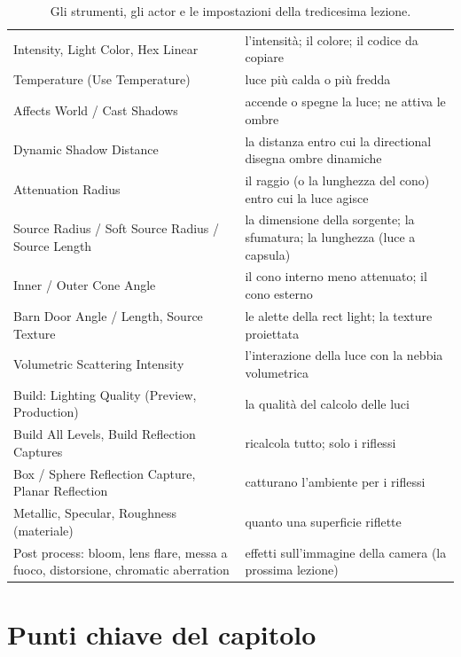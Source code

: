 \begin{table}[htbp]
\begin{tabular}{@{}p{5.8cm}p{8.2cm}@{}}
Intensity, Light Color, Hex Linear & l'intensità; il colore; il codice da copiare \\
Temperature (Use Temperature) & luce più calda o più fredda \\
Affects World / Cast Shadows & accende o spegne la luce; ne attiva le ombre \\
Dynamic Shadow Distance & la distanza entro cui la directional disegna ombre dinamiche \\
Attenuation Radius & il raggio (o la lunghezza del cono) entro cui la luce agisce \\
Source Radius / Soft Source Radius / Source Length & la dimensione della sorgente; la
sfumatura; la lunghezza (luce a capsula) \\
Inner / Outer Cone Angle & il cono interno meno attenuato; il cono esterno \\
Barn Door Angle / Length, Source Texture & le alette della rect light; la texture
proiettata \\
Volumetric Scattering Intensity & l'interazione della luce con la nebbia volumetrica \\
Build: Lighting Quality (Preview, Production) & la qualità del calcolo delle luci \\
Build All Levels, Build Reflection Captures & ricalcola tutto; solo i riflessi \\
Box / Sphere Reflection Capture, Planar Reflection & catturano l'ambiente per i riflessi \\
Metallic, Specular, Roughness (materiale) & quanto una superficie riflette \\
Post process: bloom, lens flare, messa a fuoco, distorsione, chromatic aberration &
effetti sull'immagine della camera (la prossima lezione) \\
\bottomrule
\end{tabular}
\caption{Gli strumenti, gli actor e le impostazioni della tredicesima lezione.}
\label{ue13:tab:nodi}
\end{table}

\section*{Punti chiave del capitolo}

